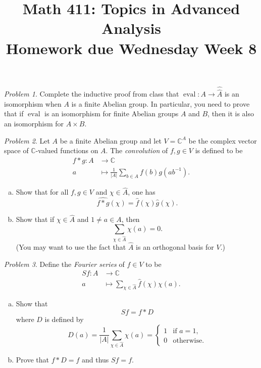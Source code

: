 \documentclass[11pt,twoside]{amsart}
\title{Math 411: Topics in Advanced Analysis\\ Homework due Wednesday Week 8}
\theoremstyle{plain}
\theoremstyle{remark}
\newtheorem{prob}{Problem}
\theoremstyle{definition}
\theoremstyle{definition}
\newcommand{\CC}{\mathbb{C}}
\newcommand{\eval}{\operatorname{eval}}
\begin{document}
\maketitle

\begin{prob}
Complete the inductive proof from class that $\eval\colon A\to \hat{\hat A}$ is an isomorphism when $A$ is a finite Abelian group. In particular, you need to prove that if $\eval$ is an isomorphism for finite Abelian groups $A$ and $B$, then it is also an isomorphism for $A\times B$.
\end{prob}

\begin{prob}
Let $A$ be a finite Abelian group and let $V = \CC^A$ be the complex vector space of $\CC$-valued functions on $A$. The \emph{convolution} of $f,g\in V$ is defined to be
\[
\begin{aligned}
  f*g\colon A&\longrightarrow \CC\\
  a&\longmapsto \frac{1}{|A|}\sum_{b\in A}f(b)g(ab^{-1}).
\end{aligned}
\]
\begin{enumerate}[(a)]
\item Show that for all $f,g\in V$ and $\chi\in \hat A$, one has
\[
  \widehat{f*g}(\chi) = \hat f(\chi)\hat g(\chi).
\]
\item Show that if $\chi\in\hat A$ and $1\ne a\in A$, then
\[
  \sum_{\chi\in \hat A}\chi(a) = 0.
\]
(You may want to use the fact that $\hat A$ is an orthogonal basis for $V$.)
\end{enumerate}
\end{prob}

\begin{prob}
Define the \emph{Fourier series} of $f\in V$ to be
\[
\begin{aligned}
  Sf\colon A&\longrightarrow \CC\\
  a&\longmapsto \sum_{\chi\in \hat A}\hat f(\chi)\chi(a).
\end{aligned}
\]
\begin{enumerate}[(a)]
\item Show that
\[
  Sf = f*D
\]
where $D$ is defined by
\[
  D(a) = \frac{1}{|A|}\sum_{\chi\in \hat A} \chi(a) =
  \begin{cases}
  1&\text{if }a=1,\\
  0&\text{otherwise}.
  \end{cases}
\]
\item Prove that $f*D = f$ and thus $Sf=f$.
\end{enumerate}
\end{prob}
\end{document}

